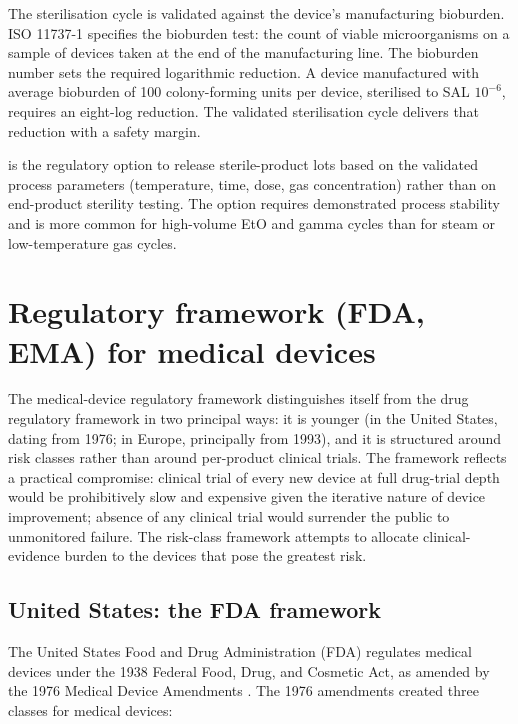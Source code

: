 The sterilisation cycle is validated against the device's
manufacturing bioburden. ISO 11737-1 specifies the bioburden test:
the count of viable microorganisms on a sample of devices taken at
the end of the manufacturing line. The bioburden number sets the
required logarithmic reduction. A device manufactured with average
bioburden of 100 colony-forming units per device, sterilised to
SAL $10^{-6}$, requires an eight-log reduction. The validated
sterilisation cycle delivers that reduction with a safety margin.

 is the regulatory option to release
sterile-product lots based on the validated process parameters
(temperature, time, dose, gas concentration) rather than on
end-product sterility testing. The option requires demonstrated
process stability and is more common for high-volume EtO and
gamma cycles than for steam or low-temperature gas cycles.

\section{Regulatory framework (FDA, EMA) for medical devices}


The medical-device regulatory framework distinguishes itself from
the drug regulatory framework in two principal ways: it is younger
(in the United States, dating from 1976; in Europe, principally
from 1993), and it is structured around risk classes rather than
around per-product clinical trials. The framework reflects a
practical compromise: clinical trial of every new device at full
drug-trial depth would be prohibitively slow and expensive given
the iterative nature of device improvement; absence of any
clinical trial would surrender the public to unmonitored failure.
The risk-class framework attempts to allocate clinical-evidence
burden to the devices that pose the greatest risk.

\subsection{United States: the FDA framework}

The United States Food and Drug Administration (FDA) regulates
medical devices under the 1938 Federal Food, Drug, and Cosmetic
Act, as amended by the 1976 Medical Device Amendments
\cite{law:v6c12-fdca-1938}. The 1976 amendments created three
classes for medical devices:

